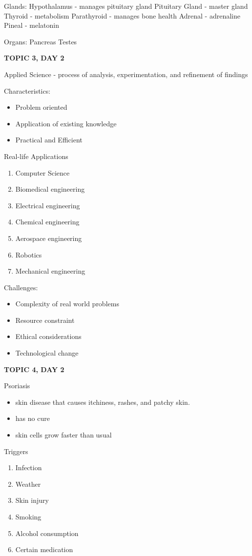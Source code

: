{{Glands:
Hypothalamus - manages pituitary gland
Pituitary Gland - master gland
Thyroid - metabolism
Parathyroid - manages bone health
Adrenal - adrenaline
Pineal - melatonin


Organs:
Pancreas
Testes

\textbf{TOPIC 3, DAY 2}


Applied Science - process of analysis, experimentation, and refinement of findings


Characteristics: 
\begin{itemize}
    \item Problem oriented
    \item Application of existing knowledge
    \item Practical and Efficient
\end{itemize}


Real-life Applications
\begin{enumerate}
    \item Computer Science
    \item Biomedical engineering
    \item Electrical engineering
    \item Chemical engineering
    \item Aerospace engineering
    \item Robotics
    \item Mechanical engineering
\end{enumerate}


Challenges:
\begin{itemize}
    \item Complexity of real world problems
    \item Resource constraint
    \item Ethical considerations
    \item Technological change
\end{itemize}

\textbf{TOPIC 4, DAY 2}


Psoriasis 
\begin{itemize}
    \item skin disease that causes itchiness, rashes, and patchy skin.
    \item has no cure
    \item skin cells grow faster than usual
\end{itemize}


Triggers
\begin{enumerate}
    \item Infection
    \item Weather
    \item Skin injury
    \item Smoking
    \item Alcohol consumption
    \item Certain medication
\end{enumerate}


}}

